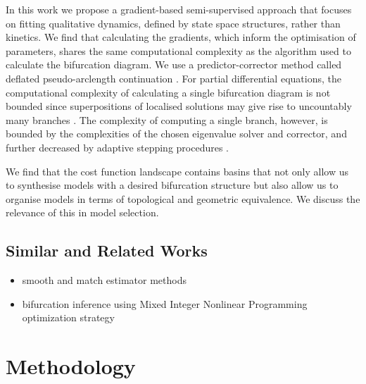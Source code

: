 In this work we propose a gradient-based semi-supervised approach that focuses on fitting qualitative dynamics, defined by state space structures, rather than kinetics. We find that calculating the gradients, which inform the optimisation of parameters, shares the same computational complexity as the algorithm used to calculate the bifurcation diagram. We use a predictor-corrector method called deflated pseudo-arclength continuation \cite{Farrell2016TheDiagrams,Veltz2019PseudoArcLengthContinuation.jl}. For partial differential equations, the computational complexity of calculating a single bifurcation diagram is not bounded since superpositions of localised solutions may give rise to uncountably many branches \cite{Avitabile2010ToEquation}. The complexity of computing a single branch, however, is bounded by the complexities of the chosen eigenvalue solver and corrector, and further decreased by adaptive stepping procedures \cite{Aruliah2016AlgorithmContinuation}.

We find that the cost function landscape contains basins that not only allow us to synthesise models with a desired bifurcation structure but also allow us to organise models in terms of topological and geometric equivalence. We discuss the relevance of this in model selection.

\subsection{Similar and Related Works}

\begin{itemize}
    \item smooth and match estimator methods \cite{Ranciati2017BayesianParameters}
    \item bifurcation inference using Mixed Integer Nonlinear Programming optimization strategy \cite{Otero-Muras2018Optimization-basedModels}
\end{itemize}
\clearpage

\section{Methodology}


